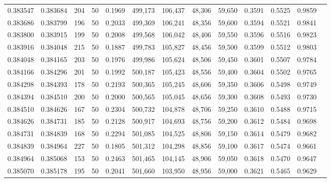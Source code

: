 \begin{tabular}{rrrrrrrrrrrrr}
0.383547 & 0.383684 &   204 &  50 &                                     0.1969 & 499,173 & 106,437 &  48,306 &  59,650 & 0.3591 & 0.5525 & 0.9859 \\
0.383686 & 0.383799 &   196 &  50 &                                     0.2033 & 499,369 & 106,241 &  48,356 &  59,600 & 0.3594 & 0.5521 & 0.9841 \\
0.383800 & 0.383915 &   199 &  50 &                                     0.2008 & 499,568 & 106,042 &  48,406 &  59,550 & 0.3596 & 0.5516 & 0.9823 \\
0.383916 & 0.384048 &   215 &  50 &                                     0.1887 & 499,783 & 105,827 &  48,456 &  59,500 & 0.3599 & 0.5512 & 0.9803 \\
0.384048 & 0.384165 &   203 &  50 &                                     0.1976 & 499,986 & 105,624 &  48,506 &  59,450 & 0.3601 & 0.5507 & 0.9784 \\
0.384166 & 0.384296 &   201 &  50 &                                     0.1992 & 500,187 & 105,423 &  48,556 &  59,400 & 0.3604 & 0.5502 & 0.9765 \\
0.384298 & 0.384393 &   178 &  50 &                                     0.2193 & 500,365 & 105,245 &  48,606 &  59,350 & 0.3606 & 0.5498 & 0.9749 \\
0.384394 & 0.384510 &   200 &  50 &                                     0.2000 & 500,565 & 105,045 &  48,656 &  59,300 & 0.3608 & 0.5493 & 0.9730 \\
0.384510 & 0.384626 &   167 &  50 &                                     0.2304 & 500,732 & 104,878 &  48,706 &  59,250 & 0.3610 & 0.5488 & 0.9715 \\
0.384626 & 0.384731 &   185 &  50 &                                     0.2128 & 500,917 & 104,693 &  48,756 &  59,200 & 0.3612 & 0.5484 & 0.9698 \\
0.384731 & 0.384839 &   168 &  50 &                                     0.2294 & 501,085 & 104,525 &  48,806 &  59,150 & 0.3614 & 0.5479 & 0.9682 \\
0.384839 & 0.384964 &   227 &  50 &                                     0.1805 & 501,312 & 104,298 &  48,856 &  59,100 & 0.3617 & 0.5474 & 0.9661 \\
0.384964 & 0.385068 &   153 &  50 &                                     0.2463 & 501,465 & 104,145 &  48,906 &  59,050 & 0.3618 & 0.5470 & 0.9647 \\
0.385070 & 0.385178 &   195 &  50 &                                     0.2041 & 501,660 & 103,950 &  48,956 &  59,000 & 0.3621 & 0.5465 & 0.9629 \\

\end{tabular}
